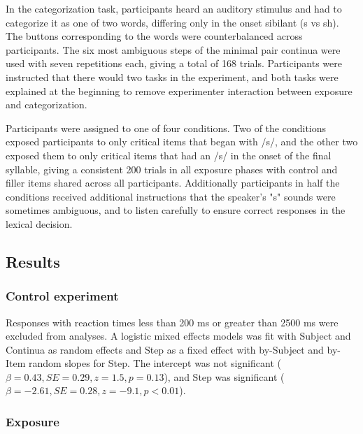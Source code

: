In the categorization task, participants heard an auditory stimulus and had to categorize it as one of two words, differing only in the onset sibilant (s vs sh).  
The buttons corresponding to the words were counterbalanced across participants.  
The six most ambiguous steps of the minimal pair continua were used with seven repetitions each, giving a total of 168 trials.
Participants were instructed that there would two tasks in the experiment, and both tasks were explained at the beginning to remove experimenter interaction between exposure and categorization.  

Participants were assigned to one of four conditions. 
Two of the conditions exposed participants to only critical items that began with /s/, and the other two exposed them to only critical items that had an /s/ in the onset of the final syllable, giving a consistent 200 trials in all exposure phases with control and filler items shared across all participants. 
Additionally participants in half the conditions received additional instructions that the speaker's "s" sounds were sometimes ambiguous, and to listen carefully to ensure correct responses in the lexical decision.

\subsection{Results}

\subsubsection{Control experiment}

Responses with reaction times less than 200 ms or greater than 2500 ms were excluded from analyses. 
A logistic mixed effects models was fit with Subject and Continua as random effects and Step as a fixed effect with by-Subject and by-Item random slopes for Step. 
The intercept was not significant ($\beta = 0.43, SE = 0.29, z = 1.5, p = 0.13$), and Step was significant ($\beta = -2.61, SE = 0.28, z = -9.1, p < 0.01$).

\subsubsection{Exposure}

